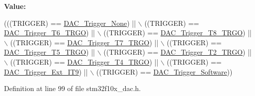 {\bfseries Value\+:}
\begin{DoxyCode}
(((TRIGGER) == \hyperlink{group___d_a_c__trigger__selection_ga7849138e043267668d755390d923e4ba}{DAC\_Trigger\_None}) || \(\backslash\)
                                 ((TRIGGER) == \hyperlink{group___d_a_c__trigger__selection_ga083307783678a2f1d3066db57dc84cfe}{DAC\_Trigger\_T6\_TRGO}) || \(\backslash\)
                                 ((TRIGGER) == \hyperlink{group___d_a_c__trigger__selection_ga756700c6621eadb807e21a16966580a0}{DAC\_Trigger\_T8\_TRGO}) || \(\backslash\)
                                 ((TRIGGER) == \hyperlink{group___d_a_c__trigger__selection_ga9b92d497746be54af46ae4e9c1fc4a6f}{DAC\_Trigger\_T7\_TRGO}) || \(\backslash\)
                                 ((TRIGGER) == \hyperlink{group___d_a_c__trigger__selection_ga35352cebfd1ae8a3d63e374a5d86a85d}{DAC\_Trigger\_T5\_TRGO}) || \(\backslash\)
                                 ((TRIGGER) == \hyperlink{group___d_a_c__trigger__selection_ga3bfbff1e03af1fd17a57a43e57420fe6}{DAC\_Trigger\_T2\_TRGO}) || \(\backslash\)
                                 ((TRIGGER) == \hyperlink{group___d_a_c__trigger__selection_ga58ccb2de3d22d66ee975152f5edb330a}{DAC\_Trigger\_T4\_TRGO}) || \(\backslash\)
                                 ((TRIGGER) == \hyperlink{group___d_a_c__trigger__selection_ga67c15b2c26246a2304f9db28e25adcc4}{DAC\_Trigger\_Ext\_IT9}) || \(\backslash\)
                                 ((TRIGGER) == \hyperlink{group___d_a_c__trigger__selection_gadef77bb8bbd109232900902402ef637f}{DAC\_Trigger\_Software}))
\end{DoxyCode}


Definition at line 99 of file stm32f10x\+\_\+dac.\+h.

